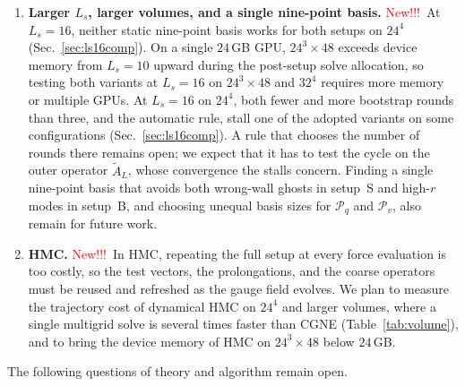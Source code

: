 \documentclass[11pt,a4paper]{article}
\newcounter{alg}
\newif\ifshownew \shownewtrue
\DeclareRobustCommand\New{\ifshownew\textcolor{red}{New!!!}\ \else\ignorespaces\fi}
\numberwithin{equation}{section}
\newcommand{\Dpv}{D_{\mathrm{PV}}}
\newcommand{\AL}{\tilde A_{L}}
\newcommand{\Pro}{\mathcal P}
\newcommand{\Pq}{\Pro_q}
\newcommand{\Pv}{\Pro_v}
\begin{document}
\begin{enumerate}
\item \textbf{Larger $L_s$, larger volumes, and a single nine-point basis.} \New At $L_s=16$,
neither static nine-point basis works for both setups on $24^4$ (Sec.~\ref{sec:ls16comp}). On a
single $24$\,GB GPU, $24^3\times48$ exceeds device memory from $L_s=10$ upward during the
post-setup solve allocation, so testing both variants at $L_s=16$ on $24^3\times48$ and $32^4$
requires more memory or multiple GPUs. At $L_s=16$ on $24^4$, both fewer and more bootstrap rounds than three, and the
automatic rule, stall one of the adopted variants on some configurations
(Sec.~\ref{sec:ls16comp}). A rule that chooses the number of rounds there remains open; we expect
that it has to test the cycle on the outer operator $\AL$, whose convergence the stalls concern. Finding
a single nine-point basis that avoids both wrong-wall ghosts in setup~S and high-$r$ modes in
setup~B, and choosing unequal basis sizes for $\Pq$ and $\Pv$, also remain for future work.

\item \textbf{HMC.} \New In HMC, repeating the full setup at every force evaluation is too costly,
so the test vectors, the prolongations, and the coarse operators must be reused and refreshed as the gauge
field evolves. We plan to measure the trajectory cost of dynamical HMC on $24^4$ and larger
volumes, where a single multigrid solve is several times faster than CGNE
(Table~\ref{tab:volume}), and to bring the device memory of HMC on $24^3\times48$ below
$24$\,GB.

\end{enumerate}
\else
The following questions of theory and algorithm remain open.
\end{document}
